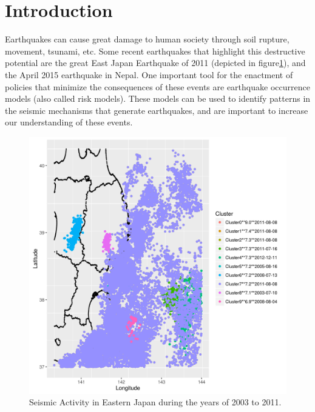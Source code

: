 \section{Introduction}\label{intro}




Earthquakes can cause great damage to human society through soil
rupture, movement, tsunami, etc. Some recent earthquakes that
highlight this destructive potential are the great East Japan
Earthquake of 2011 (depicted in figure\ref{GreatEastJapan}), and the
April 2015 earthquake in Nepal. One important tool for the enactment
of policies that minimize the consequences of these events are
earthquake occurrence models (also called risk models). These models
can be used to identify patterns in the seismic mechanisms that
generate earthquakes, and are important to increase our understanding
of these events.



\begin{figure}[]
	\centering
	\includegraphics[width=.55\textwidth]{img/slc_leste.png}
	\caption{Seismic Activity in Eastern Japan during the years of 2003 to 2011.}
	\label{GreatEastJapan}
\end{figure}

